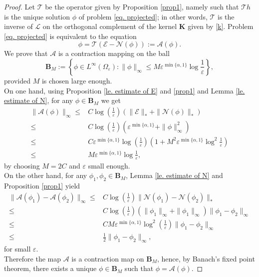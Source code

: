 \documentclass[11pt]{article}
\begin{document}
\begin{proof}
Let $\mathcal T$ be the operator given by Proposition \ref{prop1}, namely such that $\mathcal Th$ is the unique solution $\phi$ of problem \eqref{eq. projected}; in other words, $\mathcal T$ is the inverse of $\mathcal L$ on the orthogonal complement of the kernel $\mathbf K$ given by \eqref{k}. Problem \eqref{eq. projected} is equivalent to the equation
$$\phi=\mathcal T(\mathcal E-\mathcal N(\phi)):=\mathcal A(\phi).$$
We prove that $\mathcal A$ is a contraction mapping on the ball
$$\mathbf B_M:=\left\{\phi\in L^\infty(\Omega_\varepsilon):\|\phi\|_\infty\le M\varepsilon^{\min\{\alpha,1\}}\log\frac1\varepsilon\right\},$$
provided $M$ is chosen large enough.\\
On one hand, using Proposition \ref{le. estimate of E} and \ref{prop1} and Lemma \ref{le. estimate of N}, for any $\phi\in\mathbf B_M$ we get
\begin{align*}
\|\mathcal A(\phi)\|_\infty\le&C\log\left(\frac1\varepsilon\right)(\|\mathcal E\|_\ast+\|\mathcal N (\phi)\|_\ast)\\
\le&C\log\left(\frac1\varepsilon\right)\left(\varepsilon^{\min\{\alpha,1\}}+\|\phi\|_\infty^2\right)\\
\le&C\varepsilon^{\min\{\alpha,1\}}\log\left(\frac1\varepsilon\right)\left(1+M^2\varepsilon^{\min\{\alpha,1\}}\log^2\frac1\varepsilon\right)\\
\le&M\varepsilon^{\min\{\alpha,1\}}\log\frac1\varepsilon,
\end{align*}
by choosing $M=2C$ and $\varepsilon$ small enough.\\
On the other hand, for any $\phi_1,\phi_2\in\mathbf B_M$, Lemma \ref{le. estimate of N} and Proposition \ref{prop1} yield
\begin{align*}
\|\mathcal A(\phi_1)-\mathcal A(\phi_2)\|_\infty\le&C\log\left(\frac1\varepsilon\right)\|\mathcal N(\phi_1)-\mathcal N(\phi_2)\|_\ast\\
\le&C\log\left(\frac1\varepsilon\right)(\|\phi_1\|_\infty+\|\phi_1\|_\infty)\|\phi_1-\phi_2\|_\infty\\
\le&CM\varepsilon^{\min\{\alpha,1\}}\log^2\left(\frac1\varepsilon\right)\|\phi_1-\phi_2\|_\infty\\
\le&\frac12\|\phi_1-\phi_2\|_\infty,
\end{align*}
for small $\varepsilon$.\\
Therefore the map $\mathcal A$ is a contraction map on $\mathbf B_M$, hence, by Banach's fixed point theorem, there exists a unique $\phi\in\mathbf B_M$ such that $\phi=\mathcal A(\phi)$.
\end{proof}\
\end{document}
